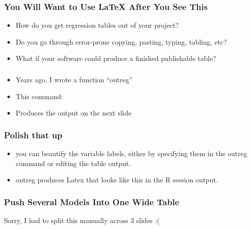 \documentclass[10pt,english]{beamer}
\begin{document}
\begin{frame}[containsverbatim]
  \frametitle{You Will Want to Use \LaTeX{}     After You See This}

  \begin{itemize}
    \item How do you get regression tables out of your project?
    \item Do you go through error-prone copying, pasting, typing,
      tabling, etc?
    \item What if your software could produce a finished
      publishable table?
    \end{itemize}
  \end{frame}



\begin{frame}[containsverbatim]
  \frametitle{}
  \begin{itemize}
    \item Years ago, I wrote a function ``outreg''





    \item This command:


   \item Produces the output on the next slide
  \end{itemize}
\end{frame}

\begin{frame}



\end{frame}




\begin{frame}[containsverbatim]
  \frametitle{Polish that up}

  \begin{itemize}
    \item you can beautify the variable labels, either by specifying
      them in the outreg command or editing the table output.
    \item outreg produces Latex that looks like this in the R session output.



\end{itemize}
\end{frame}


\begin{frame}
  \frametitle{Push Several Models Into One Wide Table}



  Sorry, I had to split this manually across 3 slides :(

\end{frame}
\end{document}
